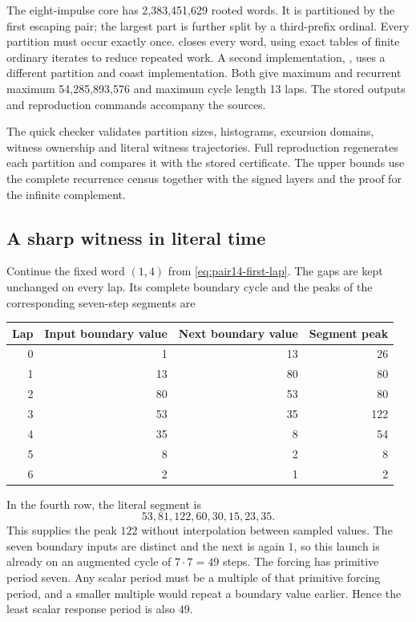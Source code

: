 The eight-impulse core has 2,383,451,629 rooted words. It is partitioned
by the first escaping pair; the largest part is further split by a
third-prefix ordinal. Every partition must occur exactly once.
 closes every
word, using exact tables of finite ordinary iterates to reduce repeated
work. A second implementation,
, uses a different
partition and coast implementation. Both give maximum and recurrent
maximum 54,285,893,576 and maximum cycle length 13 laps. The stored
outputs and reproduction commands accompany the sources.

The quick checker validates partition sizes, histograms, excursion domains,
witness ownership and literal witness trajectories. Full reproduction
regenerates each partition and compares it with the stored certificate.
The upper bounds use the complete recurrence census together with the
signed layers and the proof for the infinite complement.

\subsection{A sharp witness in literal time}

Continue the fixed word $(1,4)$ from
\eqref{eq:pair14-first-lap}. The gaps are kept unchanged on every
lap. Its complete boundary cycle and the peaks of the corresponding
seven-step segments are
\begin{center}
\begin{tabular}{rrrr}\toprule
Lap & Input boundary value & Next boundary value & Segment peak\\\midrule
0&1&13&26\\
1&13&80&80\\
2&80&53&80\\
3&53&35&122\\
4&35&8&54\\
5&8&2&8\\
6&2&1&2\\\bottomrule
\end{tabular}
\end{center}
In the fourth row, the literal segment is
\[
 53,81,122,60,30,15,23,35.
\]
This supplies the peak $122$ without interpolation between sampled
values. The seven boundary inputs are distinct and the next is again
$1$, so this launch is already on an augmented cycle of $7\cdot7=49$
steps. The forcing has primitive period seven. Any scalar period
must be a multiple of that primitive forcing period, and a smaller
multiple would repeat a boundary value earlier. Hence the least
scalar response period is also $49$.

